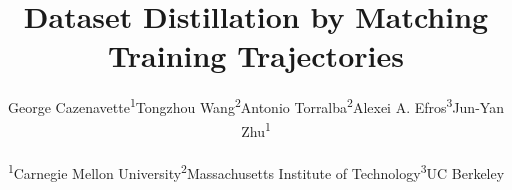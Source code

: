 \documentclass[10pt,twocolumn,letterpaper]{article}
\begin{document}
\title{Dataset Distillation by Matching Training Trajectories}

\author{George Cazenavette\textsuperscript{1}\;\;\;\;\;Tongzhou Wang\textsuperscript{2}\;\;\;\;\;Antonio Torralba\textsuperscript{2}\;\;\;\;\;Alexei A. Efros\textsuperscript{3}\;\;\;\;\;Jun-Yan Zhu\textsuperscript{1}\\
\\
\textsuperscript{1}Carnegie Mellon University\;\;\;\;\;\textsuperscript{2}Massachusetts Institute of Technology\;\;\;\;\;\textsuperscript{3}UC Berkeley
}





















{\small


}
\clearpage

\appendix

\end{document}
